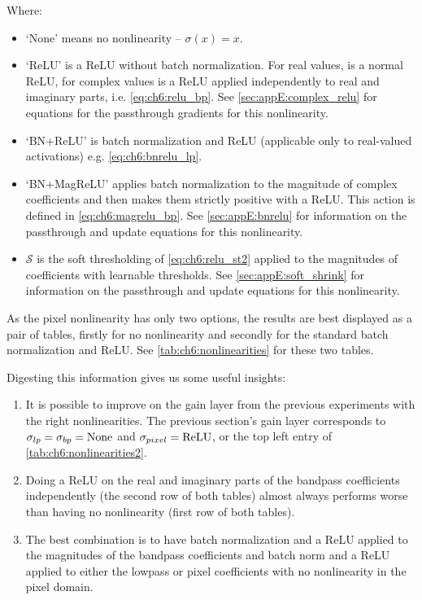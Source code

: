 Where:
\begin{itemize}
  \item `None' means no nonlinearity -- $\sigma(x) = x$.
  \item `ReLU' is a ReLU without batch normalization. For real values, is a
    normal ReLU, for complex values is a ReLU applied independently to real and
    imaginary parts, i.e.
    \eqref{eq:ch6:relu_bp}. See \autoref{sec:appE:complex_relu} for equations
    for the passthrough gradients for this nonlinearity.
  \item `BN+ReLU' is batch normalization and ReLU (applicable only to real-valued
    activations) e.g. \eqref{eq:ch6:bnrelu_lp}.
  \item `BN+MagReLU' applies batch normalization to the magnitude of complex
    coefficients and then makes them strictly positive with a ReLU. This action
    is defined in \eqref{eq:ch6:magrelu_bp}. See \autoref{sec:appE:bnrelu} for
    information on the passthrough and update equations for this nonlinearity.
  \item $\mathcal{S}$ is the soft thresholding of \eqref{eq:ch6:relu_st2}
    applied to the magnitudes of coefficients with learnable thresholds.  See
    \autoref{sec:appE:soft_shrink} for information on the passthrough and update
    equations for this nonlinearity.
\end{itemize}



As the pixel nonlinearity has only two options, the results are best displayed as
a pair of tables, firstly for no nonlinearity and secondly for the
standard batch normalization and ReLU. See
\autoref{tab:ch6:nonlinearities} for these two tables. 

Digesting this information gives us some useful insights: 
\begin{enumerate}
  \item It is possible to improve on the gain layer from the previous experiments
    with the right nonlinearities. The previous section's gain layer corresponds
    to $\sigma_{lp} = \sigma_{bp} = \mathrm{None}$ and $\sigma_{pixel} = \mathrm{ReLU}$, or
    the top left entry of \autoref{tab:ch6:nonlinearities2}.
  \item Doing a ReLU on the real and imaginary parts of the bandpass
    coefficients independently (the second row of both tables) almost always
    performs worse than having no nonlinearity (first row of both tables).
  \item The best combination is to have batch normalization and a ReLU applied
    to the magnitudes of the bandpass coefficients and batch norm and a ReLU
    applied to either the lowpass or pixel coefficients with no nonlinearity in
    the pixel domain.
\end{enumerate}

